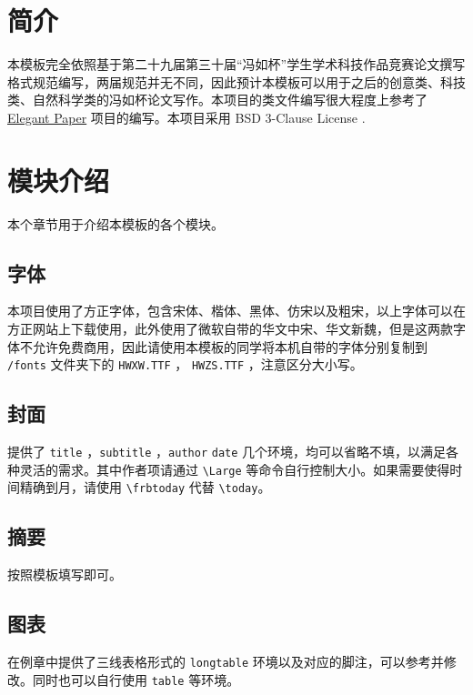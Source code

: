\documentclass[lang=cn,12pt]{frbpaper}
\begin{document}
\tableofcontents
\clearpage


\makemain

\section{简介}

本模板完全依照基于第二十九届第三十届“冯如杯”学生学术科技作品竞赛论文撰写格式规范编写，两届规范并无不同，因此预计本模板可以用于之后的创意类、科技类、自然科学类的冯如杯论文写作。本项目的类文件编写很大程度上参考了 \href{https://github.com/ElegantLaTeX/ElegantPaper}{Elegant Paper} 项目的编写。本项目采用  BSD 3-Clause License .

\section{模块介绍}

本个章节用于介绍本模板的各个模块。

\subsection{字体}

本项目使用了方正字体，包含宋体、楷体、黑体、仿宋以及粗宋，以上字体可以在方正网站上下载使用，此外使用了微软自带的华文中宋、华文新魏，但是这两款字体不允许免费商用，因此请使用本模板的同学将本机自带的字体分别复制到  \lstinline{/fonts} 文件夹下的 \lstinline{HWXW.TTF} ， \lstinline{HWZS.TTF} ，注意区分大小写。

\subsection{封面}

提供了 \lstinline{title} ，\lstinline{subtitle} ，\lstinline{author} \lstinline{date} 几个环境，均可以省略不填，以满足各种灵活的需求。其中作者项请通过 \lstinline{\Large} 等命令自行控制大小。如果需要使得时间精确到月，请使用 \lstinline{\frbtoday} 代替 \lstinline{\today}。

\subsection{摘要}

按照模板填写即可。

\subsection{图表}

在例章中提供了三线表格形式的 \lstinline{longtable} 环境以及对应的脚注，可以参考并修改。同时也可以自行使用 \lstinline{table} 等环境。
\end{document}
